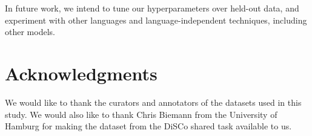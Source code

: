 \documentclass[11pt,a4paper]{article}
\begin{document}
In future work, we intend to tune our hyperparameters over held-out data, and experiment with other languages and language-independent techniques, including other models.

\section*{Acknowledgments}
We would like to thank the curators and annotators of the datasets used in this study.
We would also like to thank Chris Biemann from the University of Hamburg for making the dataset from the DiSCo shared task available to us.






\end{document}
